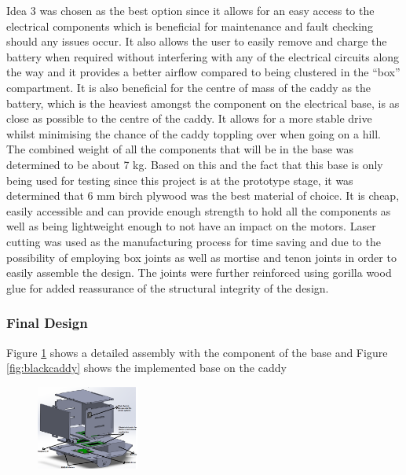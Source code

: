 \documentclass[11pt,landscape]{article}
\begin{document}
\begin{multicols}{2}
    
    Idea 3 was chosen as the best option since it allows for an easy access to
    the electrical components which is beneficial for maintenance and fault
    checking should any issues occur. It also allows the user to easily remove
    and charge the battery when required without interfering with any of the
    electrical circuits along the way and it provides a better airflow compared
    to being clustered in the “box” compartment. It is also beneficial for the
    centre of mass of the caddy as the battery, which is the heaviest amongst
    the component on the electrical base, is as close as possible to the centre
    of the caddy. It allows for a more stable drive whilst minimising the chance
    of the caddy toppling over when going on a hill. The combined weight of all
    the components that will be in the base was determined to be about 7 kg.
    Based on this and the fact that this base is only being used for testing
    since this project is at the prototype stage, it was determined that 6 mm
    birch plywood was the best material of choice. It is cheap, easily
    accessible and can provide enough strength to hold all the components as
    well as being lightweight enough to not have an impact on the motors. Laser
    cutting was used as the manufacturing process for time saving and due to the
    possibility of employing box joints as well as mortise and tenon joints in
    order to easily assemble the design. The joints were further reinforced
    using gorilla wood glue for added reassurance of the structural integrity of
    the design.
    
    
\subsubsection{Final Design}
Figure \ref{fig:final} shows a detailed assembly with the component of the base
and Figure \ref{fig:blackcaddy} shows the implemented base on the caddy

\begin{figure}[H]
    \begin{center}
        \includegraphics[width=0.3\textwidth]{basefinal.png}
        \label{fig:final}
    \end{center}
\end{figure}


\end{multicols}
\end{document}
